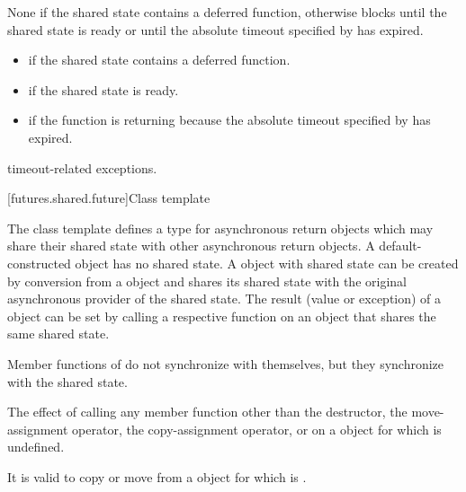 \begin{itemdescr}
\pnum
{}%
\effects
None if the shared state contains a deferred function,
otherwise
blocks until the shared state is ready or until
the absolute timeout specified by  has expired.

\pnum
\returns

\begin{itemize}
\item {} if the shared state contains a deferred
function.

\item {} if the shared state is ready.

\item {} if the function is returning because the
absolute timeout
specified by  has expired.
\end{itemize}

\pnum
\throws
timeout-related exceptions.
\end{itemdescr}


[futures.shared.future]{Class template }

\pnum
The class template  defines a type for asynchronous return objects
which may share their shared state with other asynchronous return
objects. A default-constructed 
object has no shared state. A  object with
shared state can
be created
by conversion from a  object and shares its shared state with the
original asynchronous provider of the shared state.
The result (value or exception) of a  object
can be set by
calling a respective function on an
object that shares the same shared state.

\pnum
\begin{note}
Member functions of  do not synchronize with themselves,
but they synchronize with the shared state.
\end{note}

\pnum
The effect of calling any member function other than the destructor,
the move-assignment operator, the copy-assignment operator, or
 on a  object for which  is undefined.
\begin{note}
It is valid to copy or move from a 
object for which  is .
\end{note}

